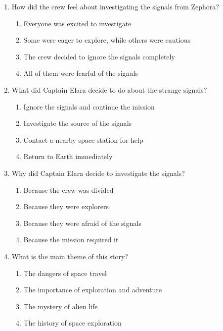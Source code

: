 \documentclass[12pt]{article}
\begin{document}
\begin{enumerate}
\item How did the crew feel about investigating the signals from Zephora?
\begin{enumerate}[label=\Alph*.]
    \item Everyone was excited to investigate
    \item Some were eager to explore, while others were cautious
    \item The crew decided to ignore the signals completely
    \item All of them were fearful of the signals
\end{enumerate}

\vspace{0.5cm}

\item What did Captain Elara decide to do about the strange signals?
\begin{enumerate}[label=\Alph*.]
    \item Ignore the signals and continue the mission
    \item Investigate the source of the signals
    \item Contact a nearby space station for help
    \item Return to Earth immediately
\end{enumerate}

\vspace{0.5cm}

\item Why did Captain Elara decide to investigate the signals?
\begin{enumerate}[label=\Alph*.]
    \item Because the crew was divided
    \item Because they were explorers
    \item Because they were afraid of the signals
    \item Because the mission required it
\end{enumerate}

\vspace{0.5cm}

\item What is the main theme of this story?
\begin{enumerate}[label=\Alph*.]
    \item The dangers of space travel
    \item The importance of exploration and adventure
    \item The mystery of alien life
    \item The history of space exploration
\end{enumerate}


\end{enumerate}
\end{document}
